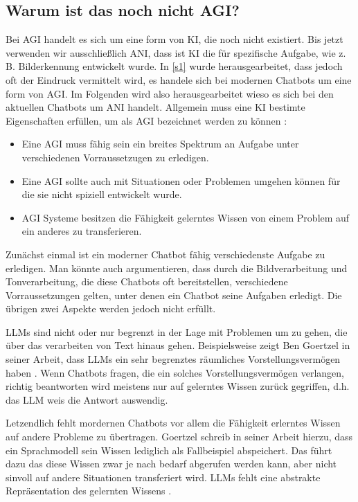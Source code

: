 	
	\subsection{Warum ist das noch nicht AGI?}\label{s2ss3}
	Bei AGI handelt es sich um eine form von KI, die noch nicht existiert. Bis jetzt verwenden wir ausschließlich 
	ANI, dass ist KI die für spezifische Aufgabe, wie z. B. Bilderkennung entwickelt wurde. In \ref{s1} wurde 
	herausgearbeitet, dass jedoch oft der Eindruck vermittelt wird, es handele sich bei modernen Chatbots um 
	eine form von AGI. Im Folgenden wird also herausgearbeitet wieso es sich bei den aktuellen Chatbots um ANI 
	handelt. Allgemein muss eine KI bestimte Eigenschaften erfüllen, um als AGI bezeichnet werden zu können 
	\cite[S. 8]{goertzel23}:
	\begin{itemize}
	\item Eine AGI muss fähig sein ein breites Spektrum an Aufgabe unter verschiedenen Vorraussetzugen zu erledigen. 
	\item Eine AGI sollte auch mit Situationen oder Problemen umgehen können für die sie nicht spiziell entwickelt wurde. 
	\item AGI Systeme besitzen die Fähigkeit gelerntes Wissen von einem Problem auf ein anderes zu transferieren. 
	\end{itemize}	
	Zunächst einmal ist ein moderner Chatbot fähig verschiedenste Aufgabe zu erledigen. Man könnte auch argumentieren,
	dass durch die Bildverarbeitung und Tonverarbeitung, die diese Chatbots oft bereitstellen, verschiedene Vorraussetzungen 
	gelten, unter denen ein Chatbot seine Aufgaben erledigt. Die übrigen zwei Aspekte werden jedoch nicht erfüllt. 
	
	LLMs sind nicht oder nur begrenzt in der Lage mit Problemen um zu gehen, die über das verarbeiten von Text hinaus gehen. 
	Beispielsweise zeigt Ben Goertzel in seiner Arbeit, dass LLMs ein sehr begrenztes räumliches Vorstellungsvermögen haben 
	\cite[S. 32-35]{goertzel23}. Wenn Chatbots fragen, die ein solches Vorstellungsvermögen verlangen, richtig beantworten 
	wird meistens nur auf gelerntes Wissen zurück gegriffen, d.h. das LLM weis die Antwort auswendig.
	
	Letzendlich fehlt mordernen Chatbots vor allem die Fähigkeit erlerntes Wissen auf andere Probleme zu übertragen. Goertzel schreib in
	seiner Arbeit hierzu, dass ein Sprachmodell sein Wissen lediglich als Fallbeispiel abspeichert. Das führt dazu das diese Wissen
	zwar je nach bedarf abgerufen werden kann, aber nicht sinvoll auf andere Situationen transferiert wird. LLMs fehlt eine 
	abstrakte Repräsentation des gelernten Wissens \cite[S. 81f]{goertzel23}. 
	
